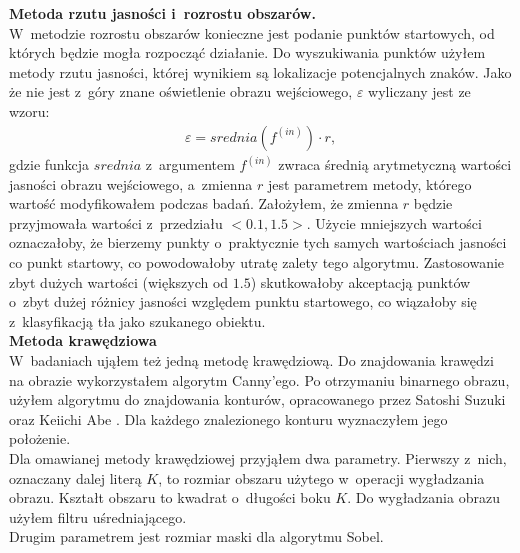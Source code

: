 \textbf{Metoda rzutu jasności i~rozrostu obszarów.}\\
 W~metodzie rozrostu obszarów konieczne jest podanie punktów startowych, od których będzie mogła rozpocząć działanie. Do wyszukiwania punktów użyłem metody rzutu jasności, której wynikiem są lokalizacje potencjalnych znaków. Jako że nie jest z~góry znane oświetlenie obrazu wejściowego, $\varepsilon$ wyliczany jest ze wzoru:
\begin{gather*}
  \varepsilon = srednia(f^{(in)}) \cdot r,
\end{gather*}
gdzie funkcja $srednia$ z~argumentem $f^{(in)}$ zwraca średnią arytmetyczną wartości jasności obrazu wejściowego, a~zmienna $r$ jest parametrem metody, którego wartość modyfikowałem podczas badań. Założyłem, że zmienna $r$ będzie przyjmowała wartości z~przedziału $\big<0.1, 1.5\big>$. Użycie mniejszych wartości oznaczałoby, że bierzemy punkty o~praktycznie tych samych wartościach jasności co punkt startowy, co powodowałoby utratę zalety tego algorytmu. Zastosowanie zbyt dużych wartości (większych od $1.5$) skutkowałoby akceptacją punktów o~zbyt dużej różnicy jasności względem punktu startowego, co wiązałoby się z~klasyfikacją tła jako szukanego obiektu.  \\

\textbf{Metoda krawędziowa}\\
 W~badaniach ująłem też jedną metodę krawędziową. Do znajdowania krawędzi na obrazie wykorzystałem algorytm Canny'ego. Po otrzymaniu binarnego obrazu, użyłem algorytmu do znajdowania konturów, opracowanego przez Satoshi Suzuki oraz Keiichi Abe \cite{suzuki85}. Dla każdego znalezionego konturu wyznaczyłem jego położenie.\\
Dla omawianej metody krawędziowej przyjąłem dwa parametry. Pierwszy z~nich, oznaczany dalej literą $K$, to rozmiar obszaru użytego w~operacji wygładzania obrazu. Kształt obszaru to kwadrat o~długości boku $K$. Do wygładzania obrazu użyłem filtru uśredniającego. \\
Drugim parametrem jest rozmiar maski dla algorytmu Sobel.
